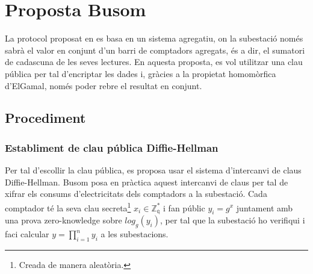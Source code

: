 \documentclass{article}
\begin{document}
\section{Proposta Busom}
La protocol proposat en \cite{busom} es basa en un sistema agregatiu, on la subestació només sabrà el valor en conjunt d'un barri de comptadors agregats, és a dir, el sumatori de cadascuna de les seves lectures. En aquesta proposta, es vol utilitzar una clau pública per tal d'encriptar les dades i, gràcies a la propietat homomòrfica d'ElGamal, només poder rebre el resultat en conjunt.
\subsection{Procediment}
\subsubsection{Establiment de clau pública Diffie-Hellman}
Per tal d'escollir la clau pública, es proposa usar el sistema d'intercanvi de claus Diffie-Hellman. Busom \cite{busom} posa en pràctica aquest intercanvi de claus per tal de xifrar els consums d'electricitats dels comptadors a la subestació. Cada comptador té la seva clau secreta\footnote{Creada de manera aleatòria.} $x_i \in \mathbb{Z_q^*} $ i fan públic $y_i = g^x$ juntament amb una prova zero-knowledge sobre $log_g(y_i)$, per tal que la subestació ho verifiqui i faci calcular $y = \prod_{i=1}^{n} y_i$ a les subestacions.
\end{document}
